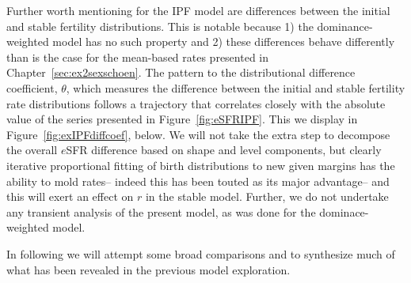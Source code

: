 Further worth mentioning for the IPF model are differences between the initial
and stable fertility distributions. This is notable because 1) the
dominance-weighted model has no such property and 2) these differences behave
differently than is the case for the mean-based rates presented in
Chapter~\ref{sec:ex2sexschoen}. The pattern to the
distributional difference coefficient, $\theta$, which measures the
difference between the initial and stable fertility rate distributions follows a
trajectory that correlates closely with the absolute value of the series
presented in Figure~\ref{fig:eSFRIPF}. This we display in
Figure~\ref{fig:exIPFdiffcoef}, below. We will not take the extra step to
decompose the overall $e$SFR difference based on shape and level components, but
clearly iterative proportional fitting of birth distributions to new given
margins has the ability to mold rates-- indeed this has been touted as its
major advantage-- and this will exert an effect on $r$ in the stable model.
Further, we do not undertake any transient analysis of the present model, as was
done for the dominace-weighted model.

In following we will attempt some broad comparisons and to synthesize much of
what has been revealed in the previous model exploration.

\FloatBarrier